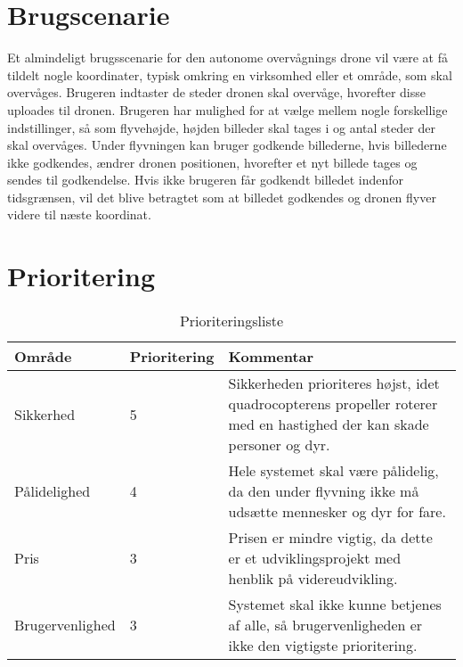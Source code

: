 \section{Brugscenarie}

Et almindeligt brugsscenarie for den autonome overvågnings drone vil være at få tildelt nogle koordinater, typisk omkring en virksomhed eller et område, som skal overvåges.
Brugeren indtaster de steder dronen skal overvåge, hvorefter disse uploades til dronen. 
Brugeren har mulighed for at vælge mellem nogle forskellige indstillinger, så som flyvehøjde, højden billeder skal tages i og antal steder der skal overvåges.
Under flyvningen kan bruger godkende billederne, hvis billederne ikke godkendes, ændrer dronen positionen, hvorefter et nyt billede tages og sendes til godkendelse. Hvis ikke brugeren får godkendt billedet indenfor tidsgrænsen, vil det blive betragtet som at billedet godkendes og dronen flyver videre til næste koordinat.

\section{Prioritering}

\begin{table}[H]
	\centering
		\begin{tabular}{|l|l|p{7 cm}|} 
		\hline
			Område & Prioritering & Kommentar \\ \hline
			Sikkerhed & 5 & Sikkerheden prioriteres højst, idet quadrocopterens propeller roterer med en hastighed der kan skade personer og dyr.   \\ \hline
			Pålidelighed & 4 & Hele systemet skal være pålidelig, da den under flyvning ikke må udsætte mennesker og dyr for fare.  \\ \hline
			Pris & 3 & Prisen er mindre vigtig, da dette er et udviklingsprojekt med henblik på videreudvikling.   \\ \hline
			Brugervenlighed & 3 & Systemet skal ikke kunne betjenes af alle, så brugervenligheden er ikke den vigtigste prioritering. \\ \hline
		\end{tabular}
	\caption{Prioriteringsliste}
\end{table}
